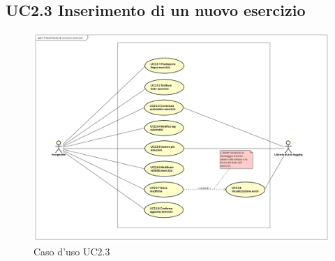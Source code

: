 




\subsection{UC2.3 Inserimento di un nuovo esercizio}

\begin{figure}[H]
	\centering
	\includegraphics[width=18cm]{img/UC23.png} 
	\caption{Caso d'uso UC2.3}
\end{figure}


